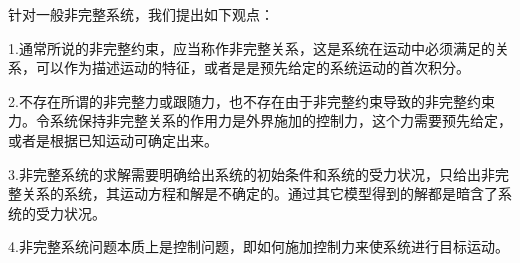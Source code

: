 \documentclass{ctexart}
\begin{document}
针对一般非完整系统，我们提出如下观点：

1.通常所说的非完整约束，应当称作非完整关系，这是系统在运动中必须满足的关系，可以作为描述运动的特征，或者是是预先给定的系统运动的首次积分。

2.不存在所谓的非完整力或跟随力，也不存在由于非完整约束导致的非完整约束力。令系统保持非完整关系的作用力是外界施加的控制力，这个力需要预先给定，或者是根据已知运动可确定出来。

3.非完整系统的求解需要明确给出系统的初始条件和系统的受力状况，只给出非完整关系的系统，其运动方程和解是不确定的。通过其它模型得到的解都是暗含了系统的受力状况。

4.非完整系统问题本质上是控制问题，即如何施加控制力来使系统进行目标运动。
\end{document}
